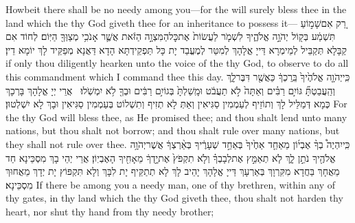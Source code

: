 {Howbeit there shall be no needy among you—for the \lord\space will surely bless thee in the land which the \lord\space thy God giveth thee for an inheritance to possess it—}{}
{רַ֚ק אִם\maqqaf שָׁמ֣וֹעַ תִּשְׁמַ֔ע בְּק֖וֹל יְהֹוָ֣ה אֱלֹהֶ֑יךָ לִשְׁמֹ֤ר לַעֲשׂוֹת֙ אֶת\maqqaf כׇּל\maqqaf הַמִּצְוָ֣ה הַזֹּ֔את אֲשֶׁ֛ר אָנֹכִ֥י מְצַוְּךָ֖ הַיּֽוֹם׃}
{לְחוֹד אִם קַבָּלָא תְּקַבֵּיל לְמֵימְרָא דַּייָ אֱלָהָךְ לְמִטַּר לְמֶעֱבַד יָת כָּל תַּפְקֵידְתָּא הָדָא דַּאֲנָא מְפַקֵּיד לָךְ יוֹמָא דֵין׃}
{if only thou diligently hearken unto the voice of the \lord\space thy God, to observe to do all this commandment which I command thee this day.}{}
{כִּֽי\maqqaf יְהֹוָ֤ה אֱלֹהֶ֙יךָ֙ בֵּֽרַכְךָ֔ כַּאֲשֶׁ֖ר דִּבֶּר\maqqaf לָ֑ךְ וְהַֽעֲבַטְתָּ֞ גּוֹיִ֣ם רַבִּ֗ים וְאַתָּה֙ לֹ֣א תַעֲבֹ֔ט וּמָֽשַׁלְתָּ֙ בְּגוֹיִ֣ם רַבִּ֔ים וּבְךָ֖ לֹ֥א יִמְשֹֽׁלוּ׃ \setuma }
{אֲרֵי יְיָ אֱלָהָךְ בָּרְכָךְ כְּמָא דְּמַלֵּיל לָךְ וְתוֹזֵיף לְעַמְמִין סַגִּיאִין וְאַתְּ לָא תְזִיף וְתִשְׁלוֹט בְּעַמְמִין סַגִּיאִין וּבָךְ לָא יִשְׁלְטוּן׃}
{For the \lord\space thy God will bless thee, as He promised thee; and thou shalt lend unto many nations, but thou shalt not borrow; and thou shalt rule over many nations, but they shall not rule over thee.}{}
\newseder
{}%
{כִּֽי\maqqaf יִהְיֶה֩ בְךָ֨ אֶבְי֜וֹן מֵאַחַ֤ד אַחֶ֙יךָ֙ בְּאַחַ֣ד שְׁעָרֶ֔יךָ בְּאַ֨רְצְךָ֔ אֲשֶׁר\maqqaf יְהֹוָ֥ה אֱלֹהֶ֖יךָ נֹתֵ֣ן לָ֑ךְ לֹ֧א תְאַמֵּ֣ץ אֶת\maqqaf לְבָבְךָ֗ וְלֹ֤א תִקְפֹּץ֙ אֶת\maqqaf יָ֣דְךָ֔ מֵאָחִ֖יךָ הָאֶבְיֽוֹן׃}
{אֲרֵי יְהֵי בָךְ מִסְכֵּינָא חַד מֵאֲחָךְ בַּחֲדָא מִקִּרְוָךְ בְּאַרְעָךְ דַּייָ אֱלָהָךְ יָהֵיב לָךְ לָא תְתַקֵּיף יָת לִבָּךְ וְלָא תִּקְפּוֹץ יָת יְדָךְ מֵאֲחוּךְ מִסְכֵּינָא׃}
{If there be among you a needy man, one of thy brethren, within any of thy gates, in thy land which the \lord\space thy God giveth thee, thou shalt not harden thy heart, nor shut thy hand from thy needy brother;}{}
